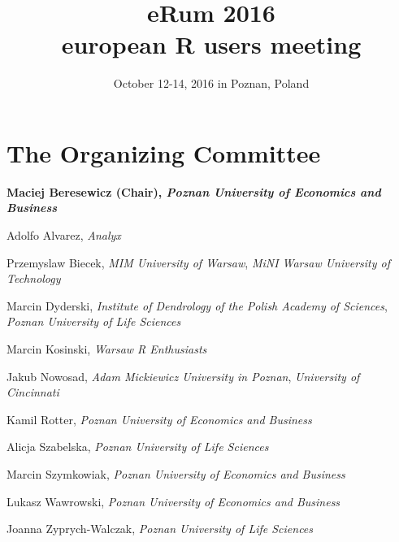 \documentclass[11pt,twoside]{book}
\title{eRum 2016 \\ european R users meeting}
\author{October 12-14, 2016 in Poznan, Poland}
\date{}
\begin{document}


\clearpage

\frontmatter
\maketitle

\chapter{The Organizing Committee}

\textbf{Maciej Beresewicz (Chair), \textit{Poznan University of Economics and Business}}

Adolfo Alvarez, \textit{Analyx}

Przemyslaw Biecek, \textit{MIM University of Warsaw}, \textit{MiNI Warsaw University of Technology}

Marcin Dyderski, \textit{Institute of Dendrology of the Polish Academy of Sciences}, \textit{Poznan University of Life Sciences}

Marcin Kosinski, \textit{Warsaw R Enthusiasts}

Jakub Nowosad, \textit{Adam Mickiewicz University in Poznan}, \textit{University of Cincinnati}

Kamil Rotter, \textit{Poznan University of Economics and Business}

Alicja Szabelska, \textit{Poznan University of Life Sciences}

Marcin Szymkowiak, \textit{Poznan University of Economics and Business}

Lukasz Wawrowski, \textit{Poznan University of Economics and Business}

Joanna Zyprych-Walczak, \textit{Poznan University of Life Sciences}
\end{document}

